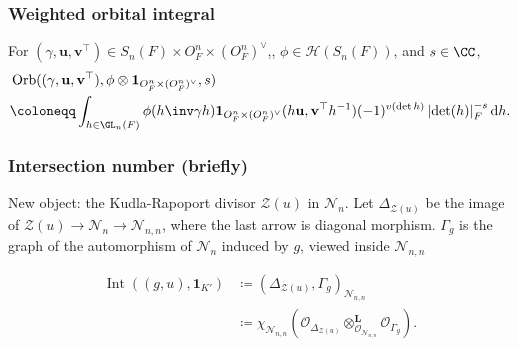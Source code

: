 \documentclass[11pt]{beamer}
\DeclareMathOperator{\Int}{Int}
\DeclareMathOperator{\Orb}{Orb}
\DeclareMathOperator{\U}{U}
\newcommand{\HH}{\mathcal{H}}
\newcommand{\VV}{\mathbb{V}}
\renewcommand{\OO}{O}
\newcommand{\RZ}{\mathcal{N}}
\newcommand{\Sheaf}{\mathcal O}
\newcommand{\ZD}{\mathcal{Z}}
\newcommand{\guv}{{(\gamma, \uu, \vv^\top)}}
\newcommand{\jiao}{\mathop{\otimes}^{\mathbf{L}}} %
\newcommand{\oneV}{\mathbf{1}_{\OO_F^n \times (\OO_F^n)^\vee}}
\newcommand{\uu}{\mathbf{u}}
\newcommand{\vv}{\mathbf{v}}
\begin{document}
\begin{frame}
  \frametitle{Weighted orbital integral}
  For $\guv \in S_n(F) \times \OO_F^n \times (\OO_F^n)^\vee$,,
  $\phi \in \HH(S_n(F))$, and $s \in \CC$,
  \begin{align*}
    & \Orb((\gamma, \uu, \vv^\top), \phi \otimes \oneV, s) \\
    &\coloneqq \int_{h \in \GL_n(F)} \phi(h\inv \gamma h) \oneV(h \uu, \vv^\top h^{-1})
      (-1)^{v(\det h)} \left\lvert \det(h) \right\rvert_F^{-s} \odif h.
  \end{align*}
\end{frame}

\begin{frame}
  \frametitle{Intersection number (briefly)}
  \begin{itemize}
    \ii New object: the \alert{Kudla-Rapoport divisor $\ZD(u)$} in $\RZ_n$.
    \ii Let $\Delta_{\ZD(u)}$ be the image of $\ZD(u) \to \RZ_n \to \RZ_{n,n}$,
    where the last arrow is diagonal morphism.
    \ii $\Gamma_g$ is the graph of the automorphism of $\RZ_n$ induced by $g$,
    viewed inside $\RZ_{n,n}$
  \end{itemize}
  \begin{definition}
    \begin{align*}
      \Int((g,u), \mathbf{1}_{K'})
      &\coloneqq \left( \Delta_{\ZD(u)}, \Gamma_g \right)_{\RZ_{n,n}} \\
      &\coloneqq \chi_{\RZ_{n,n}}
      \left( \Sheaf_{\Delta_{\ZD(u)}} \jiao_{\Sheaf_{\RZ_{n,n}}} \Sheaf_{\Gamma_g}  \right).
    \end{align*}
  \end{definition}
\end{frame}
\end{document}
